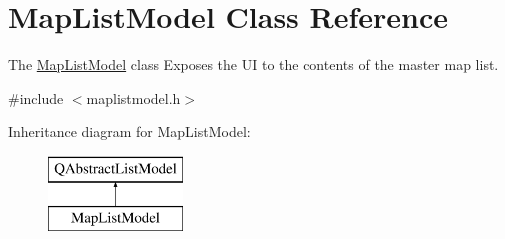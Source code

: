 \hypertarget{class_map_list_model}{}\section{Map\+List\+Model Class Reference}
\label{class_map_list_model}


The \hyperlink{class_map_list_model}{Map\+List\+Model} class Exposes the UI to the contents of the master map list.  




{\ttfamily \#include $<$maplistmodel.\+h$>$}

Inheritance diagram for Map\+List\+Model\+:\begin{figure}[H]
\begin{center}
\leavevmode
\includegraphics[height=2.000000cm]{class_map_list_model}
\end{center}
\end{figure}
